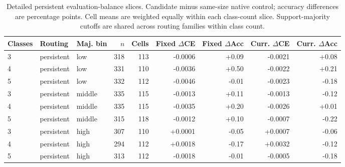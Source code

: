 \begin{table}[ht]
\centering\footnotesize
\caption{Detailed persistent evaluation-balance slices. Candidate minus same-size native control; accuracy differences are percentage points. Cell means are weighted equally within each class-count slice. Support-majority cutoffs are shared across routing families within class count.}\label{tab:balance-persistent}
\begin{tabular}{@{}lllrrrrrr@{}}\toprule
Classes & Routing & Maj. bin & $n$ & Cells & Fixed $\Delta$CE & Fixed $\Delta$Acc & Curr. $\Delta$CE & Curr. $\Delta$Acc\\\midrule
3 & persistent & low & 318 & 113 & -0.0006 & +0.09 & -0.0021 & +0.08\\
4 & persistent & low & 331 & 110 & -0.0036 & +0.50 & -0.0022 & +0.21\\
5 & persistent & low & 332 & 112 & -0.0046 & -0.01 & -0.0023 & -0.18\\
3 & persistent & middle & 335 & 115 & -0.0013 & +0.11 & -0.0013 & -0.12\\
4 & persistent & middle & 335 & 115 & -0.0035 & +0.20 & -0.0026 & +0.01\\
5 & persistent & middle & 315 & 118 & -0.0012 & +0.10 & -0.0007 & -0.22\\
3 & persistent & high & 307 & 110 & +0.0001 & -0.05 & +0.0007 & -0.06\\
4 & persistent & high & 294 & 112 & +0.0018 & -0.17 & +0.0032 & -0.12\\
5 & persistent & high & 313 & 112 & -0.0018 & -0.01 & -0.0005 & -0.18\\
\bottomrule\end{tabular}
\end{table}
